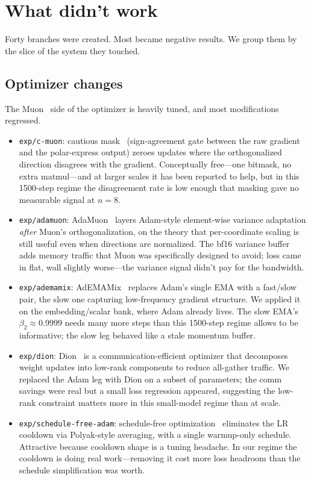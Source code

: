 \documentclass[10pt,letterpaper]{article}
\newcommand{\code}[1]{\texttt{\small #1}}
\begin{document}
\section{What didn't work}
\label{sec:fail}

Forty branches were created. Most became negative results. We group them by the slice of the system they touched.

\subsection{Optimizer changes}
The Muon~\cite{muon_jordan} side of the optimizer is heavily tuned, and most modifications regressed.
\begin{itemize}[leftmargin=1.2em,itemsep=4pt]
  \item \code{exp/c-muon}: cautious mask~\cite{cmuon} (sign-agreement gate between the raw gradient and the polar-express output) zeroes updates where the orthogonalized direction disagrees with the gradient. Conceptually free---one bitmask, no extra matmul---and at larger scales it has been reported to help, but in this 1500-step regime the disagreement rate is low enough that masking gave no measurable signal at $n=8$.
  \item \code{exp/adamuon}: AdaMuon~\cite{adamuon} layers Adam-style element-wise variance adaptation \emph{after} Muon's orthogonalization, on the theory that per-coordinate scaling is still useful even when directions are normalized. The bf16 variance buffer adds memory traffic that Muon was specifically designed to avoid; loss came in flat, wall slightly worse---the variance signal didn't pay for the bandwidth.
  \item \code{exp/ademamix}: AdEMAMix~\cite{ademamix} replaces Adam's single EMA with a fast/slow pair, the slow one capturing low-frequency gradient structure. We applied it on the embedding/scalar bank, where Adam already lives. The slow EMA's $\beta_2 \approx 0.9999$ needs many more steps than this 1500-step regime allows to be informative; the slow leg behaved like a stale momentum buffer.
  \item \code{exp/dion}: Dion~\cite{dion} is a communication-efficient optimizer that decomposes weight updates into low-rank components to reduce all-gather traffic. We replaced the Adam leg with Dion on a subset of parameters; the comm savings were real but a small loss regression appeared, suggesting the low-rank constraint matters more in this small-model regime than at scale.
  \item \code{exp/schedule-free-adam}: schedule-free optimization~\cite{schedfree} eliminates the LR cooldown via Polyak-style averaging, with a single warmup-only schedule. Attractive because cooldown shape is a tuning headache. In our regime the cooldown is doing real work---removing it cost more loss headroom than the schedule simplification was worth.

\end{itemize}
\end{document}
